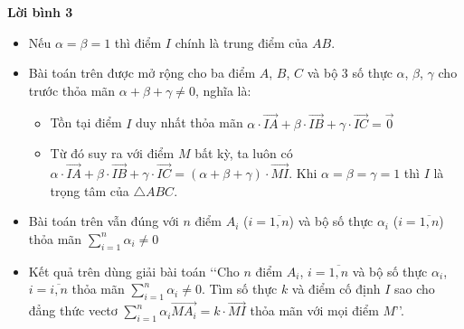 \begin{note}
	\textbf{Lời bình 3}
	\begin{itemize}
		\item Nếu $\alpha = \beta = 1$ thì điểm $I$ chính là trung điểm của $AB$.
		\item Bài toán trên được mở rộng cho ba điểm $A$, $B$, $C$ và bộ $3$ số thực $\alpha$, $\beta$, $\gamma$ cho trước thỏa mãn $\alpha +\beta +\gamma \ne 0$, nghĩa là:
		      \begin{itemize}
			      \item Tồn tại điểm $I$ duy nhất thỏa mãn $\alpha\cdot\overrightarrow{IA}+\beta\cdot\overrightarrow{IB}+\gamma\cdot\overrightarrow{IC}=\overrightarrow{0}$
			      \item Từ đó suy ra với điểm $M$ bất kỳ, ta luôn có $\alpha\cdot\overrightarrow{IA}+\beta\cdot\overrightarrow{IB}+\gamma\cdot\overrightarrow{IC} =\left(\alpha +\beta +\gamma \right)\cdot\overrightarrow{MI}$. Khi $\alpha = \beta = \gamma =1$ thì $I$ là trọng tâm của $\triangle ABC$.
		      \end{itemize}
		\item Bài toán trên vẫn đúng với $n$ điểm $A_i$ ($i=\overline{1,n}$) và bộ số thực $\alpha_i$ ($i=\overline{1,n}$) thỏa mãn $\displaystyle\sum\limits_{i=1}^n \alpha_i \ne 0$
		\item Kết quả trên dùng giải bài toán \lq\lq  Cho $n$ điểm $A_i$, $i=\overline{1,n}$ và bộ số thực $\alpha_i$, $i=\overline{i,n}$ thỏa mãn $\displaystyle\sum\limits_{i=1}^n \alpha_i \ne 0$. Tìm số thực $k$ và điểm cố định $I$ sao cho đẳng thức vectơ $\displaystyle\sum\limits_{i=1}^n \alpha_i \overrightarrow{MA_i}=k\cdot\overrightarrow{MI}$ thỏa mãn với mọi điểm $M$\rq\rq .
	\end{itemize}
\end{note}

